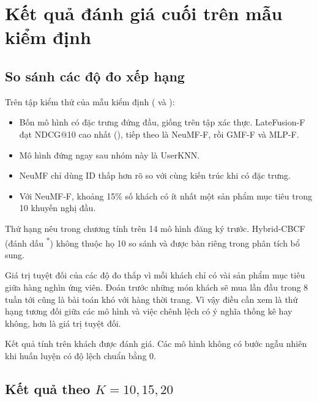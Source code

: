 \section{Kết quả đánh giá cuối trên mẫu kiểm định}
\label{sec:exp_results}

\subsection{So sánh các độ đo xếp hạng}
\label{subsec:hr_ndcg_comparison}

Trên tập kiểm thử của mẫu kiểm định ( và ):
\begin{itemize}
    \item Bốn mô hình có đặc trưng đứng đầu, giống trên tập xác thực. LateFusion-F đạt NDCG@10 cao nhất (), tiếp theo là NeuMF-F, rồi GMF-F và MLP-F.
    \item Mô hình đứng ngay sau nhóm này là UserKNN.
    \item NeuMF chỉ dùng ID thấp hơn rõ so với cùng kiến trúc khi có đặc trưng.
    \item Với NeuMF-F, khoảng 15\% số khách có ít nhất một sản phẩm mục tiêu trong 10 khuyến nghị đầu.
\end{itemize}

Thứ hạng nêu trong chương tính trên 14 mô hình đăng ký trước. Hybrid-CBCF (đánh dấu \textsuperscript{*}) không thuộc họ 10 so sánh và được bàn riêng trong phân tích bổ sung.

Giá trị tuyệt đối của các độ đo thấp vì mỗi khách chỉ có vài sản phẩm mục tiêu giữa hàng nghìn ứng viên. Đoán trước những món khách sẽ mua lần đầu trong 8 tuần tới cũng là bài toán khó với hàng thời trang. Vì vậy điều cần xem là thứ hạng tương đối giữa các mô hình và việc chênh lệch có ý nghĩa thống kê hay không, hơn là giá trị tuyệt đối.

Kết quả tính trên  khách được đánh giá. Các mô hình không có bước ngẫu nhiên khi huấn luyện có độ lệch chuẩn bằng 0.



\subsection{Kết quả theo \texorpdfstring{$K = 10, 15, 20$}{K = 10, 15, 20}}
\label{subsec:byk_results}


